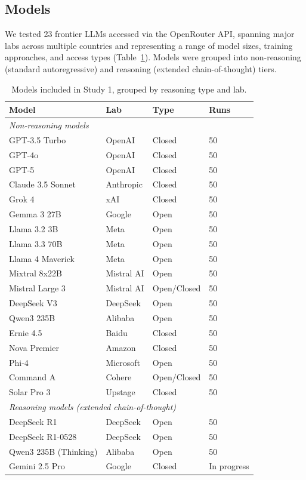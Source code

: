 \documentclass[midterm]{sparreport}
\begin{document}
\subsection{Models}

We tested 23 frontier LLMs accessed via the OpenRouter API, spanning major labs across multiple countries and representing a range of model sizes, training approaches, and access types (Table~\ref{tab:models}). Models were grouped into non-reasoning (standard autoregressive) and reasoning (extended chain-of-thought) tiers.

\begin{table}[htbp]
\centering
\caption{Models included in Study 1, grouped by reasoning type and lab.}
\label{tab:models}
\small
\begin{tabular}{llll}
\toprule
\textbf{Model} & \textbf{Lab} & \textbf{Type} & \textbf{Runs} \\
\midrule
\multicolumn{4}{l}{\textit{Non-reasoning models}} \\
GPT-3.5 Turbo & OpenAI & Closed & 50 \\
GPT-4o & OpenAI & Closed & 50 \\
GPT-5 & OpenAI & Closed & 50 \\
Claude 3.5 Sonnet & Anthropic & Closed & 50 \\
Grok 4 & xAI & Closed & 50 \\
Gemma 3 27B & Google & Open & 50 \\
Llama 3.2 3B & Meta & Open & 50 \\
Llama 3.3 70B & Meta & Open & 50 \\
Llama 4 Maverick & Meta & Open & 50 \\
Mixtral 8x22B & Mistral AI & Open & 50 \\
Mistral Large 3 & Mistral AI & Open/Closed & 50 \\
DeepSeek V3 & DeepSeek & Open & 50 \\
Qwen3 235B & Alibaba & Open & 50 \\
Ernie 4.5 & Baidu & Closed & 50 \\
Nova Premier & Amazon & Closed & 50 \\
Phi-4 & Microsoft & Open & 50 \\
Command A & Cohere & Open/Closed & 50 \\
Solar Pro 3 & Upstage & Closed & 50 \\
\midrule
\multicolumn{4}{l}{\textit{Reasoning models (extended chain-of-thought)}} \\
DeepSeek R1 & DeepSeek & Open & 50 \\
DeepSeek R1-0528 & DeepSeek & Open & 50 \\
Qwen3 235B (Thinking) & Alibaba & Open & 50 \\
Gemini 2.5 Pro & Google & Closed & In progress \\
\bottomrule
\end{tabular}
\end{table}
\end{document}
